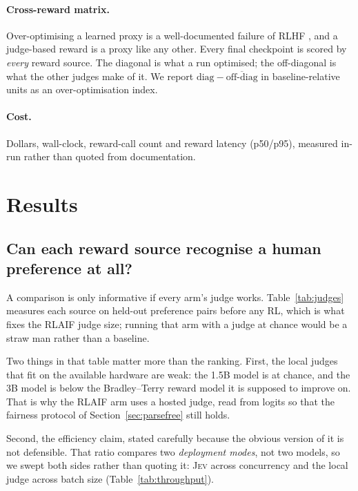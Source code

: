 \documentclass[11pt]{article}
\newcommand{\jev}{\textsc{Jev}}
\begin{document}
\paragraph{Cross-reward matrix.} Over-optimising a learned proxy is a
well-documented failure of RLHF \citep{gao2023scaling}, and a judge-based reward
is a proxy like any other. Every final checkpoint is scored by
\emph{every} reward source. The diagonal is what a run optimised; the
off-diagonal is what the other judges make of it. We report
$\text{diag} - \overline{\text{off-diag}}$ in baseline-relative units as an
over-optimisation index.

\paragraph{Cost.} Dollars, wall-clock, reward-call count and reward latency
(p50/p95), measured in-run rather than quoted from documentation.

\section{Results}

\subsection{Can each reward source recognise a human preference at all?}
\label{sec:res-judges}
A comparison is only informative if every arm's judge works. Table~\ref{tab:judges}
measures each source on held-out preference pairs before any RL, which is what
fixes the RLAIF judge size; running that arm with a judge at chance would be a
straw man rather than a baseline.


Two things in that table matter more than the ranking. First, the local judges
that fit on the available hardware are weak: the 1.5B model is at chance, and
the 3B model is below the Bradley--Terry reward model it is supposed to
improve on. That is why the RLAIF arm uses a hosted judge, read from logits so
that the fairness protocol of Section~\ref{sec:parsefree} still holds.

Second, the efficiency claim, stated carefully because the obvious version of
it is not defensible. \unskip{} That ratio
compares two \emph{deployment modes}, not two models, so we swept both sides
rather than quoting it: \jev{} across concurrency and the local judge across
batch size (Table~\ref{tab:throughput}).
\end{document}

